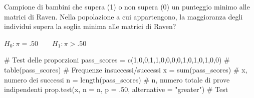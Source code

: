 \documentclass[
  ignorenonframetext,
  compress, aspectratio=149]{beamer}
\newenvironment{Shaded}{}{}
\newcommand{\AttributeTok}[1]{\textcolor[rgb]{0.00,0.34,0.68}{#1}}
\newcommand{\CommentTok}[1]{\textcolor[rgb]{0.54,0.53,0.53}{#1}}
\newcommand{\DecValTok}[1]{\textcolor[rgb]{0.69,0.50,0.00}{#1}}
\newcommand{\FunctionTok}[1]{\textcolor[rgb]{0.39,0.29,0.61}{#1}}
\newcommand{\NormalTok}[1]{\textcolor[rgb]{0.12,0.11,0.11}{#1}}
\newcommand{\OtherTok}[1]{\textcolor[rgb]{0.00,0.43,0.16}{#1}}
\newcommand{\StringTok}[1]{\textcolor[rgb]{0.75,0.01,0.01}{#1}}
\begin{document}
\begin{frame}[fragile]{}
\label{section-13}
\small

Campione di bambini che supera (1) o non supera (0) un punteggio minimo
alle matrici di Raven. Nella popolazione a cui appartengono, la
maggioranza degli individui supera la soglia minima alle matrici di
Raven?

\(H_0: \pi = .50 \qquad H_1: \pi > .50\)

\footnotesize

\begin{Shaded}
\begin{Highlighting}[]
\CommentTok{\# Test delle proporzioni}
\NormalTok{pass\_scores }\OtherTok{=} \FunctionTok{c}\NormalTok{(}\DecValTok{1}\NormalTok{,}\DecValTok{0}\NormalTok{,}\DecValTok{0}\NormalTok{,}\DecValTok{1}\NormalTok{,}\DecValTok{1}\NormalTok{,}\DecValTok{0}\NormalTok{,}\DecValTok{0}\NormalTok{,}\DecValTok{0}\NormalTok{,}\DecValTok{0}\NormalTok{,}\DecValTok{1}\NormalTok{,}\DecValTok{0}\NormalTok{,}\DecValTok{1}\NormalTok{,}\DecValTok{0}\NormalTok{,}\DecValTok{1}\NormalTok{,}\DecValTok{0}\NormalTok{,}\DecValTok{0}\NormalTok{) }\CommentTok{\# }
\FunctionTok{table}\NormalTok{(pass\_scores) }\CommentTok{\# Frequenze insuccessi/successi}
\NormalTok{x }\OtherTok{=} \FunctionTok{sum}\NormalTok{(pass\_scores) }\CommentTok{\# x, numero dei successi}
\NormalTok{n }\OtherTok{=} \FunctionTok{length}\NormalTok{(pass\_scores) }\CommentTok{\# n, numero totale di prove indipendenti}
\FunctionTok{prop.test}\NormalTok{(x, }\AttributeTok{n =}\NormalTok{ n, }\AttributeTok{p =}\NormalTok{ .}\DecValTok{50}\NormalTok{, }\AttributeTok{alternative =} \StringTok{"greater"}\NormalTok{) }\CommentTok{\# Test}
\end{Highlighting}
\end{Shaded}
\end{frame}
\end{document}
